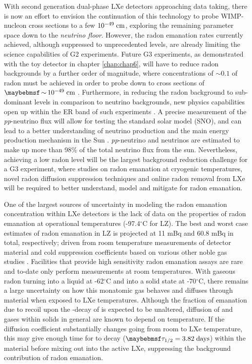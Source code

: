 With second generation dual-phase LXe detectors approaching data taking, there is now an effort to envision the continuation of this technology to probe WIMP-nucleon cross sections to a few $10^{-49} \; \text{cm}$, exploring the remaining parameter space down to the \textit{neutrino floor}. However, the radon emanation rates currently achieved, although suppressed to unprecedented levels, are already limiting the science capabilities of G2 experiments. Future G3 experiments, as demonstrated with the toy detector in chapter \ref{chap:chap6}, will have to reduce radon backgrounds by a further order of magnitude, where concentrations of $\sim 0.1$ \uBqkg{} of radon must be achieved in order to probe down to cross sections of $\sim10^{-49} \; \MathText{cm}$ \cite{Schumann:2015cpa}. Furthermore, in reducing the radon background to sub-dominant levels in comparison to neutrino backgrounds, new physics capabilities open up within the ER band of such experiments \cite{Schumann:2015cpa}. A precise measurement of the \textit{pp}-neutrino flux will allow for testing the standard solar model (SNO), and can lead to a better understanding of neutrino production and the main energy production mechanism in the Sun \cite{Aalbers:2016jon}. \textit{pp}-neutrino and \BeS{} neutrinos are estimated to make up more than 98\% of the total neutrino flux from the sun. Nevertheless, achieving a low radon level will be the largest background reduction challenge for a G3 experiment, where studies on radon emanation at cryogenic temperatures, novel radon diffusion suppression techniques and online radon removal from LXe will be required to better understand, model and mitigate for radon emanation. 

One of the largest sources of uncertainty in modeling the radon emanation concentration within LXe detectors is the lack of data on the properties of radon emanation at operational temperatures (-97.4$^{\circ{}}$C for LZ). The best and worst case estimates of radon emanation in LZ is projected at 11 mBq and 60.8 mBq in total, respectively; driven from room temperature measurements of detector material and cold suppression coefficients based on various other noble gas studies \cite{Schowalter_2010}. Facilities that provide high sensitivity radon emanation assays are rare and to-date only perform measurements at room temperatures. With gaseous radon turning into a liquid at -62$^{\circ}$C and into a solid state at -70$^{\circ}$C, there remains a large uncertainty on how this monatomic gas behaves and diffuses through material when exposed to LXe temperatures. Although the fraction of emanation due to recoil upon the \alpha{}-decay of \RnTTT{} is expected to be unaltered, diffusion of \RnTTT{} and gases within solids in general are known to depend on temperature. If the diffusion coefficient substantially changes going from room to LXe temperature, this may give enough time for \RnTTT{} to decay ($\tau_{1/2}=3.82 \; \MathText{days}$) within the material before mixing out into the active LXe, suppressing the background contribution of radon emanation.

